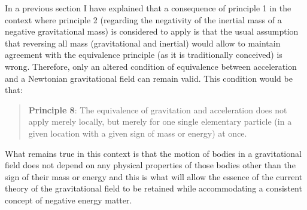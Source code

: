 \documentclass[notitlepage,12pt]{report}
\begin{document}
In a previous section I have explained that a consequence of principle 1 in the context where principle 2 (regarding the negativity of the inertial mass of a negative gravitational mass) is considered to apply is that the usual assumption that reversing all mass (gravitational and inertial) would allow to maintain agreement with the equivalence principle (as it is traditionally conceived) is wrong. Therefore, only an altered condition of equivalence between acceleration and a Newtonian gravitational field can remain valid. This condition would be that:
\begin{quote}
\textbf{Principle 8}: The equivalence of gravitation and acceleration does not apply merely locally, but merely for one single elementary particle (in a given location with a given sign of mass or energy) at once.
\end{quote}
What remains true in this context is that the motion of bodies in a gravitational field does not depend on any physical properties of those bodies other than the sign of their mass or energy and this is what will allow the essence of the current theory of the gravitational field to be retained while accommodating a consistent concept of negative energy matter.
\end{document}
